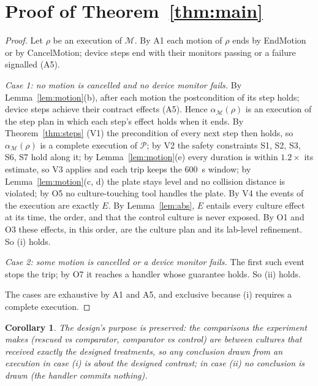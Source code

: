 \documentclass[10pt,a4paper]{article}
\theoremstyle{plain}\newtheorem{theorem}{Theorem}\newtheorem{lemma}{Lemma}\newtheorem{corollary}{Corollary}
\theoremstyle{definition}\newtheorem{definition}{Definition}\newtheorem{assumption}{Assumption}
\theoremstyle{remark}\newtheorem*{remark}{Remark}
\newcommand{\M}{\mathcal{M}}\newcommand{\Pl}{\mathcal{P}}\newcommand{\Lp}{\mathcal{L}}\newcommand{\C}{\mathcal{C}}
\begin{document}
\section{Proof of Theorem~\ref{thm:main}}\label{sec:composition}
\begin{proof}
Let $\rho$ be an execution of $\M$. By A1 each motion of $\rho$ ends by EndMotion or by CancelMotion; device steps end
with their monitors passing or a failure signalled (A5).

\emph{Case 1: no motion is cancelled and no device monitor fails.} By Lemma~\ref{lem:motion}(b), after each motion the
postcondition of its step holds; device steps achieve their contract effects (A5). Hence $\alpha_{\M}(\rho)$ is an
execution of the step plan in which each step's effect holds when it ends. By Theorem~\ref{thm:steps} (V1) the
precondition of every next step then holds, so $\alpha_{\M}(\rho)$ is a complete execution of $\Pl$; by V2 the safety
constraints S1, S2, S3, S6, S7 hold along it; by Lemma~\ref{lem:motion}(e) every duration is within $1.2\times$ its
estimate, so V3 applies and each trip keeps the 600~s window; by Lemma~\ref{lem:motion}(c, d) the plate stays level and
no collision distance is violated; by O5 no culture-touching tool handles the plate. By V4 the events of the execution
are exactly $E$. By Lemma~\ref{lem:abs}, $E$ entails every culture effect at its time, the order, and that the control
culture is never exposed. By O1 and O3 these effects, in this order, are the culture plan and its lab-level refinement.
So (i) holds.

\emph{Case 2: some motion is cancelled or a device monitor fails.} The first such event stops the trip; by O7 it reaches
a handler whose guarantee holds. So (ii) holds.

The cases are exhaustive by A1 and A5, and exclusive because (i) requires a complete execution. \qedhere
\end{proof}

\begin{corollary}
The design's purpose is preserved: the comparisons the experiment makes (rescued vs comparator, comparator vs control)
are between cultures that received exactly the designed treatments, so any conclusion drawn from an execution in case
(i) is about the designed contrast; in case (ii) no conclusion is drawn (the handler commits nothing).
\end{corollary}
\end{document}
